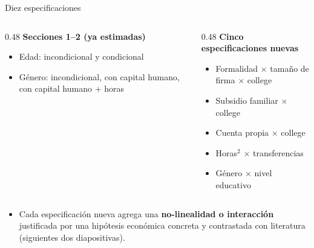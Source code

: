 \documentclass[aspectratio=169]{beamer}
\begin{document}
\begin{frame}{Diez especificaciones}
  \begin{columns}[T]
    \begin{column}{0.48\textwidth}
      \textbf{Secciones 1--2 (ya estimadas)}
      \begin{itemize}
        \footnotesize
        \item Edad: incondicional y condicional
        \item Género: incondicional, con capital humano, con capital humano + horas
      \end{itemize}
    \end{column}
    \begin{column}{0.48\textwidth}
      \textbf{Cinco especificaciones nuevas}
      \begin{itemize}
        \footnotesize
        \item Formalidad $\times$ tamaño de firma $\times$ college
        \item Subsidio familiar $\times$ college
        \item Cuenta propia $\times$ college
        \item Horas$^2$ $\times$ transferencias
        \item Género $\times$ nivel educativo
      \end{itemize}
    \end{column}
  \end{columns}
  \vspace{0.6em}
  \begin{itemize}
    \item Cada especificación nueva agrega una \textbf{no-linealidad o
      interacción} justificada por una hipótesis económica concreta y
      contrastada con literatura (siguientes dos diapositivas).
  \end{itemize}
\end{frame}
\end{document}
